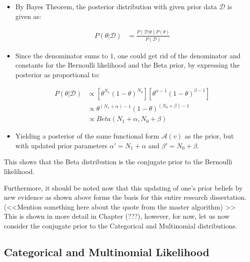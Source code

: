 \begin{itemize}
	\item  By Bayes Theorem, the posterior distribution with given prior data $\mathcal{D}$ is given as:
	
\begin{equation}
\begin{split}
	P(\theta | \mathcal{D}) &= \frac{P(\mathcal{D} | \theta) P(\theta)}{P(\mathcal{D})}
\end{split}
\end{equation}

	\item Since the denominator sums to $1$, one could get rid of the denominator and constants for the Bernoulli likelihood and the Beta prior, by expressing the posterior as proportional to:

\begin{equation}
\begin{split}
		P(\theta | \mathcal{D}) &\propto \left[\theta^{N_{1}}(1-\theta)^{N_{0}}\right] \left[\theta^{\alpha - 1} (1 - \theta)^{\beta - 1}\right] \\
		&\propto \theta^{(N_{1} + \alpha) - 1}(1-\theta)^{(N_{0} + \beta) - 1} \\
		&\propto Beta(N_{1} + \alpha, N_{0} + \beta) 
\end{split}
\end{equation}

\item Yielding a posterior of the same functional form $\mathcal{A}(v)$ as the prior, but with updated prior parameters $\alpha' = N_{1} + \alpha$ and $\beta' = N_{0} + \beta$.

\end{itemize}

This shows that the Beta distribution is the conjugate prior to the Bernoulli likelihood.

Furthermore, it should be noted now that this updating of one's prior beliefs by new evidence as shown above forms the basis for this entire research dissertation. (<<Mention something here about the quote from the master algorithm) >> This is shown in more detail in Chapter (???), however, for now, let us now consider the conjugate prior to the Categorical and Multinomial distributions.











\subsection{Categorical and Multinomial Likelihood}
\label{sec:probability:conjugate_priors:cat_mult_likelihood}

